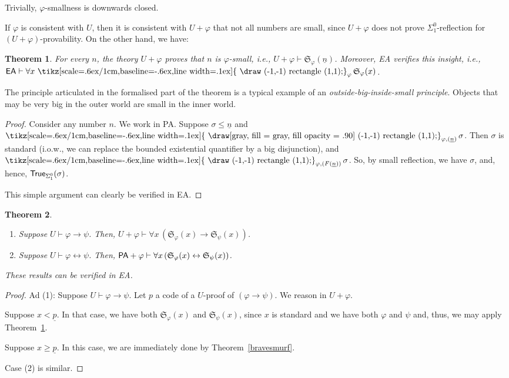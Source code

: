 \documentclass{amsart}
\newcommand{\gopr}{\gnecessary}
\renewcommand{\iff}{\leftrightarrow}
\renewcommand{\leq}{\leqslant}
\renewcommand{\geq}{\geqslant}
\renewcommand{\phi}{\varphi}
\newtheorem{theorem}{Theorem}[section]
\DeclareMathOperator{\necessary}{\text{\tikz[scale=.6ex/1cm,baseline=-.6ex,line width=.1ex]{
                            \draw (-1,-1) rectangle (1,1);}}}
\DeclareMathOperator{\gnecessary}{\text{\tikz[scale=.6ex/1cm,baseline=-.6ex,line width=.1ex]{
                            \draw[gray, fill = gray, fill opacity = .90] (-1,-1) rectangle (1,1);}}}
\newcommand{\num}[1]{{\underline {#1}}}
\newcommand{\mf}[1]{{\mathfrak {#1}}}
\newcommand{\opr}{\necessary}
\begin{document}
Trivially, $\phi$-smallness is downwards closed.

If $\phi$ is consistent with $U$, then it is consistent with $U+\phi$ that not all numbers 
are small, since $U+\phi$ does not prove $\Sigma^0_1$-reflection for
$(U+\phi)$-provability. On the other hand, we have:

\begin{theorem}\label{kleinesmurf}
For every $n$, the theory $U+\phi$ proves that $n$ is $\phi$-small, i.e., 
$U+\phi\vdash \mf S_\phi(\underline n)$. Moreover, {\sf EA} verifies this insight, i.e.,
 ${\sf EA} \vdash \forall x\, \opr_\phi \mf S_\phi(x)$.
\end{theorem}

The principle articulated in the formalised part of the theorem is a typical example of an \emph{outside-big-inside-small principle}. 
Objects that may be  very big in the outer world are  small in the inner world.

\begin{proof}
Consider any number $n$. We work in {\sf PA}. Suppose $\sigma \leq \num n$ and $\gopr_{\phi, (\num n)}\sigma$.
Then $\sigma$ is standard (i.o.w., we can replace the bounded existential quantifier by a big disjunction),  and
 $\opr_{\phi, (F(\num n))}\sigma$. So, by small reflection, we have $\sigma$, and, hence, ${\sf True}_{\Sigma^0_1}(\sigma)$.

This simple argument can clearly be verified in {\sf EA}.
\end{proof}

\begin{theorem}\label{oppervlakkigesmurf}
\begin{enumerate}[1.]
\item
Suppose $U\vdash \phi \to \psi$. Then, $U +\phi \vdash \forall x\, ({\mf S}_\phi(x) \to {\mf S}_\psi(x))$. 
\item
Suppose $U\vdash \phi \iff \psi$. Then, ${\sf PA} +\phi \vdash \forall x\, ({\mf S}_\phi(x) \iff {\mf S}_\psi(x))$. 
\end{enumerate}

\smallskip\noindent
These results can be verified in {\sf EA}.
\end{theorem}

\begin{proof}
Ad (1): Suppose $U\vdash \phi \to \psi$. Let $p$ a code of a
  $U$-proof of $( \phi \to \psi)$. 
  We reason in $U+\phi$. 
  
  Suppose $x < \num p$.
In that case, we have both  ${\mf S}_\phi(x)$ and ${\mf S}_\psi(x)$, since $x$ is standard and we have both $\phi$ and $\psi$ and, thus,
we may apply Theorem~\ref{kleinesmurf}.

Suppose $x \geq \num p$. In this case, we are immediately done  by Theorem~\ref{bravesmurf}.

Case (2) is similar. 
\end{proof}
\end{document}
